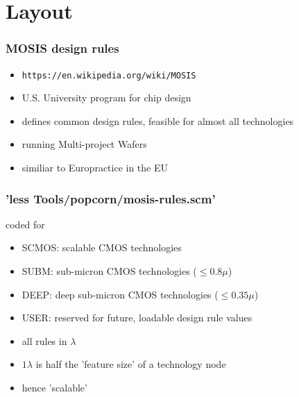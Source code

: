 \documentclass[aspectratio=169]{beamer}
\begin{document}
\section{Layout}


\begin{frame}
\frametitle{MOSIS design rules}
    \begin{itemize}
        \item \texttt{https://en.wikipedia.org/wiki/MOSIS}
        \item U.S. University program for chip design
        \item defines common design rules, feasible for almost all technologies
        \item running Multi-project Wafers
        \item similiar to Europractice in the EU
    \end{itemize}
\end{frame}


\begin{frame}
\frametitle{'less Tools/popcorn/mosis-rules.scm'}
coded for
    \newline
    \begin{itemize}
        \item SCMOS: scalable CMOS technologies
        \item SUBM:  sub-micron CMOS technologies ($\leq 0.8 \mu$)
        \item DEEP:  deep sub-micron CMOS technologies ($\leq 0.35 \mu$)
        \item USER:  reserved for future, loadable design rule values
    \newline
        \item all rules in $\lambda$
        \item $1 \lambda$ is half the 'feature size' of a technology node
        \item hence 'scalable'
    \end{itemize}
\end{frame}

\end{document}
